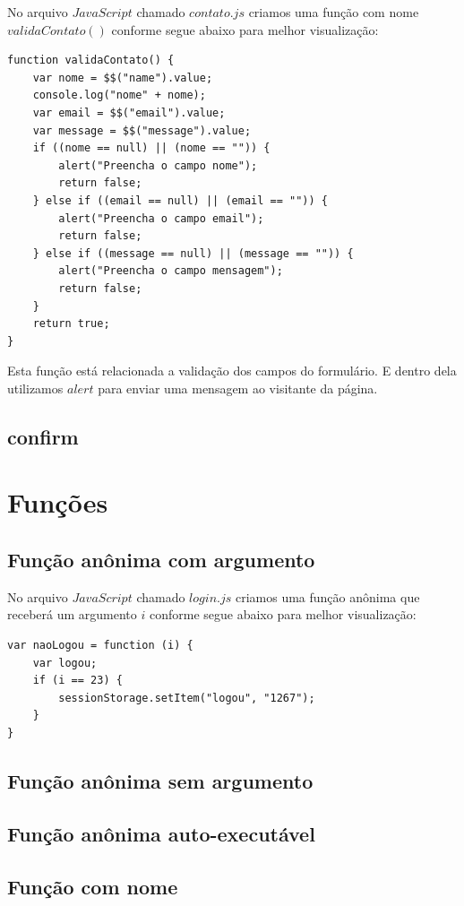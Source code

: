	No arquivo $JavaScript$ chamado $contato.js$ criamos uma função com nome $validaContato()$ conforme segue abaixo para melhor visualização:
\begin{lstlisting}
function validaContato() {
    var nome = $$("name").value;
    console.log("nome" + nome);
    var email = $$("email").value;
    var message = $$("message").value;
    if ((nome == null) || (nome == "")) {
        alert("Preencha o campo nome");
        return false;
    } else if ((email == null) || (email == "")) {
        alert("Preencha o campo email");
        return false;
    } else if ((message == null) || (message == "")) {
        alert("Preencha o campo mensagem");
        return false;
    }
    return true;
}
\end{lstlisting}
	Esta função está relacionada a validação dos campos do formulário. E dentro dela utilizamos $alert$ para enviar uma mensagem ao visitante da página.

\subsection{confirm}

\section{Funções}
\subsection{Função anônima com argumento}
	No arquivo $JavaScript$ chamado $login.js$ criamos uma função anônima que receberá um argumento $i$ conforme segue abaixo para melhor visualização:
	
\begin{lstlisting}
var naoLogou = function (i) {
    var logou;
    if (i == 23) {
        sessionStorage.setItem("logou", "1267");
    }
}
\end{lstlisting}

\subsection{Função anônima sem argumento}

\subsection{Função anônima auto-executável}

\subsection{Função com nome}

